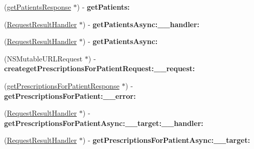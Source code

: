 \begin{DoxyCompactItemize}
\item 
\hypertarget{interface_supply_chain_service_port_binding_a1416907adc74dbcd96cd8ac8c9595b8f}{}(\hyperlink{interfaceget_patients_response}{get\+Patients\+Response} $\ast$) -\/ {\bfseries get\+Patients\+:}\label{interface_supply_chain_service_port_binding_a1416907adc74dbcd96cd8ac8c9595b8f}

\item 
\hypertarget{interface_supply_chain_service_port_binding_a08a9d1afffe99b7b21cb900fe7eb2b91}{}(\hyperlink{interface_request_result_handler}{Request\+Result\+Handler} $\ast$) -\/ {\bfseries get\+Patients\+Async\+:\+\_\+\+\_\+handler\+:}\label{interface_supply_chain_service_port_binding_a08a9d1afffe99b7b21cb900fe7eb2b91}

\item 
\hypertarget{interface_supply_chain_service_port_binding_a48fd51376f7bb96208fced3a2026d250}{}(\hyperlink{interface_request_result_handler}{Request\+Result\+Handler} $\ast$) -\/ {\bfseries get\+Patients\+Async\+:}\label{interface_supply_chain_service_port_binding_a48fd51376f7bb96208fced3a2026d250}

\item 
\hypertarget{interface_supply_chain_service_port_binding_a0f502d056df5fffec259541cb6f5d931}{}(N\+S\+Mutable\+U\+R\+L\+Request $\ast$) -\/ {\bfseries createget\+Prescriptions\+For\+Patient\+Request\+:\+\_\+\+\_\+request\+:}\label{interface_supply_chain_service_port_binding_a0f502d056df5fffec259541cb6f5d931}

\item 
\hypertarget{interface_supply_chain_service_port_binding_ad33534f9e7d240ebb92384bf47ab6d31}{}(\hyperlink{interfaceget_prescriptions_for_patient_response}{get\+Prescriptions\+For\+Patient\+Response} $\ast$) -\/ {\bfseries get\+Prescriptions\+For\+Patient\+:\+\_\+\+\_\+error\+:}\label{interface_supply_chain_service_port_binding_ad33534f9e7d240ebb92384bf47ab6d31}

\item 
\hypertarget{interface_supply_chain_service_port_binding_aced7876fa266c6d669f341214dc44500}{}(\hyperlink{interface_request_result_handler}{Request\+Result\+Handler} $\ast$) -\/ {\bfseries get\+Prescriptions\+For\+Patient\+Async\+:\+\_\+\+\_\+target\+:\+\_\+\+\_\+handler\+:}\label{interface_supply_chain_service_port_binding_aced7876fa266c6d669f341214dc44500}

\item 
\hypertarget{interface_supply_chain_service_port_binding_af9e44879f179d69c218cee8e25e8152d}{}(\hyperlink{interface_request_result_handler}{Request\+Result\+Handler} $\ast$) -\/ {\bfseries get\+Prescriptions\+For\+Patient\+Async\+:\+\_\+\+\_\+target\+:}\label{interface_supply_chain_service_port_binding_af9e44879f179d69c218cee8e25e8152d}


\end{DoxyCompactItemize}
